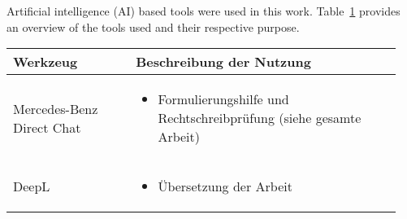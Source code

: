 \setcounter{chapter}{1}

Artificial intelligence (AI) based tools were used in this work. Table~\ref{tab:anhang_uebersicht_KI_werkzeuge} provides an overview of the tools used and their respective purpose.

\begin{table}[hbt]	
	\centering
	\renewcommand{\arraystretch}{1.5}	%
	\label{tab:anhang_uebersicht_KI_werkzeuge}
	\begin{tabular}{>{\raggedright\arraybackslash}p{0.3\linewidth} >{\raggedright\arraybackslash}p{0.65\linewidth}}
		\textbf{Werkzeug} & \textbf{Beschreibung der Nutzung}\\
		\hline 
		\hline
		Mercedes-Benz Direct Chat & 	\vspace{-\topsep}
					\begin{itemize}[noitemsep,topsep=0pt,partopsep=0pt,parsep=0pt] 
						\item Formulierungshilfe und Rechtschreibprüfung (siehe gesamte Arbeit)
				   	\end{itemize} \\
		DeepL	&	\vspace{-\topsep}
					\begin{itemize}[noitemsep,topsep=0pt,partopsep=0pt,parsep=0pt] 
					\item Übersetzung der Arbeit 
					\end{itemize} \\ 
	\end{tabular} 
\end{table}




